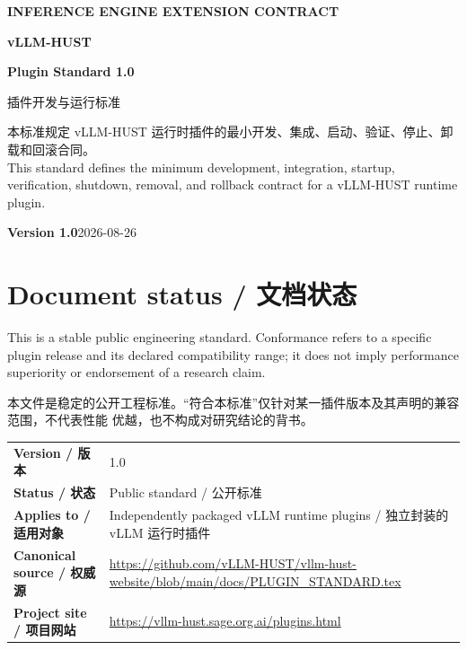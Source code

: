 \documentclass[11pt,a4paper,fontset=none]{ctexart}
\begin{document}
\begin{titlepage}
  \pagecolor{Ink}\color{white}
  \vspace*{20mm}
  {\color{Cyan}\bfseries\sffamily INFERENCE ENGINE EXTENSION CONTRACT\par}
  \vspace{15mm}
  {\fontsize{34}{40}\selectfont\bfseries\sffamily vLLM-HUST\par}
  \vspace{3mm}
  {\fontsize{27}{34}\selectfont\bfseries\sffamily Plugin Standard 1.0\par}
  \vspace{5mm}
  {\Large 插件开发与运行标准\par}
  \vfill
  \begin{tcolorbox}[colback=white!7!Ink,colframe=white!25,arc=0pt,boxrule=0.6pt]
    \color{white}
    本标准规定 vLLM-HUST 运行时插件的最小开发、集成、启动、验证、停止、卸载和回滚合同。\\
    This standard defines the minimum development, integration, startup, verification,
    shutdown, removal, and rollback contract for a vLLM-HUST runtime plugin.
  \end{tcolorbox}
  \vspace{12mm}
  {\color{Lime}\bfseries Version 1.0}\hfill 2026-08-26
  \vspace{8mm}
\end{titlepage}
\nopagecolor\color{Ink}

\section*{Document status / 文档状态}

This is a stable public engineering standard. Conformance refers to a specific plugin release and
its declared compatibility range; it does not imply performance superiority or endorsement of a
research claim.

本文件是稳定的公开工程标准。“符合本标准”仅针对某一插件版本及其声明的兼容范围，不代表性能
优越，也不构成对研究结论的背书。

\begin{longtable}{>{\bfseries}p{}p{}}
Version / 版本 & 1.0 \\
Status / 状态 & Public standard / 公开标准 \\
Applies to / 适用对象 & Independently packaged vLLM runtime plugins / 独立封装的 vLLM 运行时插件 \\
Canonical source / 权威源 & \url{https://github.com/vLLM-HUST/vllm-hust-website/blob/main/docs/PLUGIN_STANDARD.tex} \\
Project site / 项目网站 & \url{https://vllm-hust.sage.org.ai/plugins.html} \\
\end{longtable}
\end{document}
